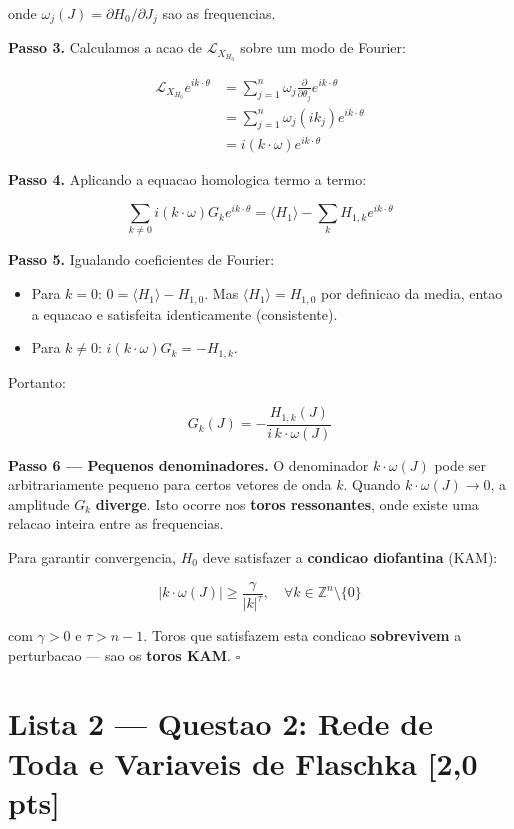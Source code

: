 \documentclass[12pt,a4paper,oneside]{article}
\begin{document}
onde $\omega_j(J) = \partial H_0/\partial J_j$ sao as frequencias.

\textbf{Passo 3.} Calculamos a acao de $\mathcal{L}_{X_{H_0}}$ sobre um
modo de Fourier:

\begin{align*}
\mathcal{L}_{X_{H_0}} e^{i k\cdot\theta} &=
\sum_{j=1}^n \omega_j \frac{\partial}{\partial\theta_j} e^{i k\cdot\theta} \\
&= \sum_{j=1}^n \omega_j (i k_j) e^{i k\cdot\theta} \\
&= i (k \cdot \omega) e^{i k\cdot\theta}
\end{align*}

\textbf{Passo 4.} Aplicando a equacao homologica termo a termo:

$$\sum_{k \neq 0} i(k\cdot\omega) G_k e^{i k\cdot\theta} =
\langle H_1\rangle - \sum_k H_{1,k} e^{i k\cdot\theta}$$

\textbf{Passo 5.} Igualando coeficientes de Fourier:

\begin{itemize}
  \item Para $k = 0$: $0 = \langle H_1\rangle - H_{1,0}$. Mas
        $\langle H_1\rangle = H_{1,0}$ por definicao da media, entao
        a equacao e satisfeita identicamente (consistente).
  \item Para $k \neq 0$: $i(k\cdot\omega) G_k = -H_{1,k}$.
\end{itemize}

Portanto:

$$\boxed{G_k(J) = -\frac{H_{1,k}(J)}{i \, k \cdot \omega(J)}}$$

\textbf{Passo 6 — Pequenos denominadores.} O denominador $k \cdot \omega(J)$
pode ser arbitrariamente pequeno para certos vetores de onda $k$. Quando
$k \cdot \omega(J) \to 0$, a amplitude $G_k$ \textbf{diverge}. Isto ocorre
nos \textbf{toros ressonantes}, onde existe uma relacao inteira entre as
frequencias.

Para garantir convergencia, $H_0$ deve satisfazer a \textbf{condicao
diofantina} (KAM):

$$|k \cdot \omega(J)| \geq \frac{\gamma}{|k|^\tau}, \quad
\forall k \in \mathbb{Z}^n \setminus \{0\}$$

com $\gamma > 0$ e $\tau > n-1$. Toros que satisfazem esta condicao
\textbf{sobrevivem} a perturbacao — sao os \textbf{toros KAM}. $\square$

\newpage
\section{Lista 2 — Questao 2: Rede de Toda e Variaveis de Flaschka [2,0 pts]}
\end{document}
